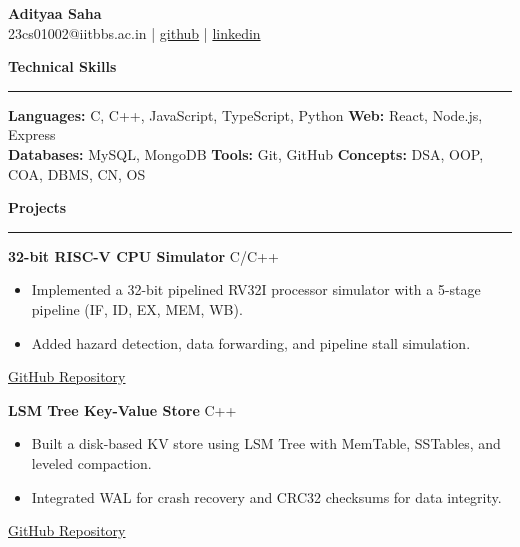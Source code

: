 \documentclass[a4paper,10pt]{article}
\begin{document}
\begin{center}
    {\LARGE \textbf{Adityaa Saha}} \\
    \vspace{2pt}
    23cs01002@iitbbs.ac.in \;|\; 
    \href{https://github.com/Adityaa-Saha17}{github} \;|\;
    \href{https://www.linkedin.com/in/adityaa-saha-533b02299}{linkedin}
\end{center}

\vspace{6pt}

\textbf{Technical Skills} \\
\hrule
\vspace{3pt}
\textbf{Languages:} C, C++, JavaScript, TypeScript, Python \quad
\textbf{Web:} React, Node.js, Express \\
\textbf{Databases:} MySQL, MongoDB \quad
\textbf{Tools:} Git, GitHub \quad
\textbf{Concepts:} DSA, OOP, COA, DBMS, CN, OS

\vspace{7pt}

\textbf{Projects} \\
\hrule
\vspace{3pt}

\textbf{32-bit RISC-V CPU Simulator} \hfill C/C++ \\
\begin{itemize}
    \item Implemented a 32-bit pipelined RV32I processor simulator with a 5-stage pipeline (IF, ID, EX, MEM, WB).
    \item Added hazard detection, data forwarding, and pipeline stall simulation.
\end{itemize}
\href{https://github.com/Adityaa-Saha17/32-bit-RISC-V-CPU-Simulator.git}{GitHub Repository}

\vspace{4pt}

\textbf{LSM Tree Key-Value Store} \hfill C++ \\
\begin{itemize}
    \item Built a disk-based KV store using LSM Tree with MemTable, SSTables, and leveled compaction.
    \item Integrated WAL for crash recovery and CRC32 checksums for data integrity.
\end{itemize}
\href{https://github.com/Adityaa-Saha17/Log-Structured-Merge-Tree}{GitHub Repository}

\vspace{4pt}
\end{document}
